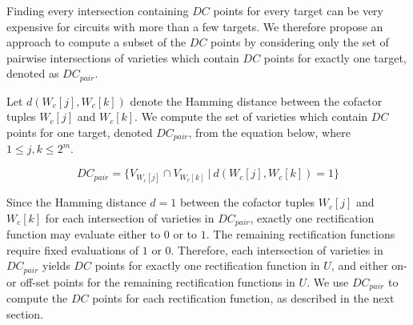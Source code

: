 

Finding every intersection containing $DC$ points for every target 
can be very expensive for circuits with more than a few targets. 
We therefore propose an approach to compute a subset of the $DC$ points by considering
only the set of pairwise intersections of varieties which contain $DC$ points for exactly one target, denoted as $DC_{pair}$.


Let $d(W_c[j], W_c[k])$ denote the Hamming distance between the cofactor tuples $W_c[j]$ and $W_c[k]$. We compute the set of varieties which contain $DC$ points for one target, denoted $DC_{pair}$, from the equation below, where $1 \leq j,k \leq 2^m$.

\begin{equation}
  \label{eqn:dc_pair}
  DC_{pair} = \{V_{W_c[j]} \cap V_{W_c[k]}~|~d(W_c[j],W_c[k]) = 1\}
\end{equation}

Since the Hamming distance $d = 1$ between the cofactor tuples $W_c[j]$ and $W_c[k]$ for each intersection of varieties in $DC_{pair}$, exactly one rectification function may evaluate either to $0$ or to $1$. The remaining rectification functions require fixed evaluations of $1$ or $0$. Therefore, each intersection of varieties in $DC_{pair}$ yields $DC$ points for exactly one rectification function in $U$, and either on- or off-set points for the remaining rectification functions in $U$. We use $DC_{pair}$ to compute the $DC$ points for each rectification function, as described in the next section. 

